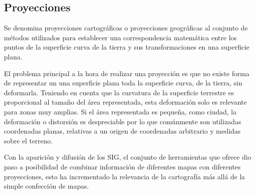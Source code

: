 \subsection{Proyecciones}
Se denomina proyecciones cartográficas o proyecciones geográficas al conjunto de métodos utilizados para establecer
una correspondencia matemática entre los puntos de la superficie curva de la tierra y sus transformaciones en una
superficie plana. 

El problema principal a la hora de realizar una proyección es que no existe forma de representar un una superficie
plana toda la superficie curva, de la tierra, sin deformarla. Teniendo en cuenta que la curvatura de la superficie terrestre
es proporcional al tamaño del área representada, esta deformación solo es relevante para zonas muy amplias. Si el área
representada es pequeña, como ciudad, la deformación o distorsión es despreciable por lo que comúnmente son utilizadas
coordenadas planas, relativas a un origen de coordenadas arbitrario y medidas sobre el terreno.

Con la aparición y difusión de los SIG, el conjunto de herramientas que ofrece dio paso a posibilidad
de combinar información de diferentes mapas con diferentes proyecciones, esto ha incrementado la relevancia de la cartografía 
más allá de la simple confección de mapas.

